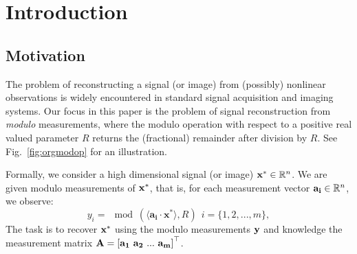 \section{Introduction}
\label{sec:intro}
\subsection{Motivation}
The problem of reconstructing a signal (or image) from (possibly) nonlinear observations is widely encountered in standard signal acquisition and imaging systems. Our focus in this paper is the problem of signal reconstruction from \textit{modulo} measurements, where the modulo operation with respect to a positive real valued parameter $R$ returns the (fractional) remainder after division by $R$. See Fig.~\ref{fig:orgmodop} for an illustration.


Formally, we consider a high dimensional signal (or image) $\mathbf{x}^* \in {\mathbb{R}}^n$. We are given modulo measurements of $\mathbf{x^*}$, that is, for each measurement vector $\mathbf{a_i} \in {\mathbb{R}}^n$, we observe:
\begin{equation}
y_i=\mod(\langle \mathbf{a_i} \cdot \mathbf{x^*} \rangle,R)~~i = \{1,2,...,m\}, %
\label{eq:modmeas0}
\end{equation} 
The task is to recover $\mathbf{x^*}$ using the modulo measurements $\mathbf{y}$ and knowledge the measurement matrix $\mathbf{A} = \left[\mathbf{a_1~a_2~...~a_m}\right]^\top$. %


